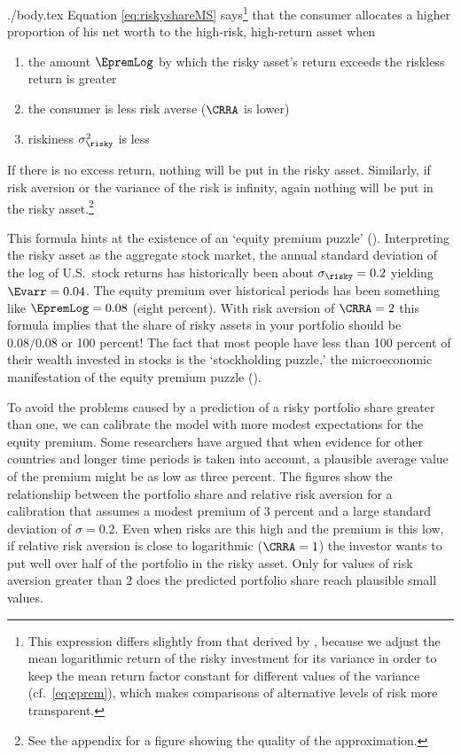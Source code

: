 \documentclass{handout}
\begin{document}
\begin{verbatimwrite}{./body.tex}
Equation \eqref{eq:riskyshareMS} says\footnote{This expression differs
  slightly from that derived by \cite{cvAppendix}, because we adjust
  the mean logarithmic return of the risky investment for its variance
  in order to keep the mean return factor constant for different values of the variance (cf.\ \eqref{eq:eprem}), which makes
  comparisons of alternative levels of risk more transparent.}  that the
consumer allocates a higher proportion of his net worth to the high-risk, high-return
asset when
\begin{enumerate}
\item the amount $\EpremLog$ by which the risky
asset's return exceeds the riskless return is greater
\item the consumer is less risk averse ($\CRRA$ is lower)
\item riskiness $\sigma^{2}_{\risky}$ is less
\end{enumerate}
If there is no excess return, nothing will be put in the risky asset.  Similarly, if 
risk aversion or the variance of the risk is infinity, again nothing 
will be put in the risky asset.\footnote{See the appendix for a figure
  showing the quality of the approximation.}

This formula hints at the existence of an `equity premium puzzle'
(\cite{mehraPrescottPuzzle}).  Interpreting the risky asset as the
aggregate stock market, the annual standard deviation of the log of
U.S.\ stock returns has historically been about $\sigma_{\risky}=0.2$
yielding $\Evarr = 0.04$.  The equity premium over historical periods
has been something like $\EpremLog = 0.08$ (eight percent).  With risk
aversion of $\CRRA=2$ this formula implies that the share of risky
assets in your portfolio should be $0.08/0.08$ or 100 percent!  The
fact that most people have less than 100 percent of their wealth
invested in stocks is the `stockholding puzzle,' the microeconomic
manifestation of the equity premium puzzle
(\cite{haliassos&bertaut:fewholdstocks}).

To avoid the problems caused by a prediction of a risky portfolio
share greater than one, we can calibrate the model with more modest
expectations for the equity premium.  Some researchers have argued
that when evidence for other countries and longer time periods is
taken into account, a plausible average value of the premium might be
as low as three percent.  The figures show the relationship
between the portfolio share and relative risk aversion for a
calibration that assumes a modest premium of 3 percent and a large
standard deviation of $\sigma=0.2$.  Even when risks are this high and
the premium is this low, if relative risk aversion is close to
logarithmic ($\CRRA = 1$) the investor wants to put well over half of
the portfolio in the risky asset.  Only for values of risk aversion
greater than 2 does the predicted portfolio share reach plausible
small values.


\end{verbatimwrite}
\end{document}
